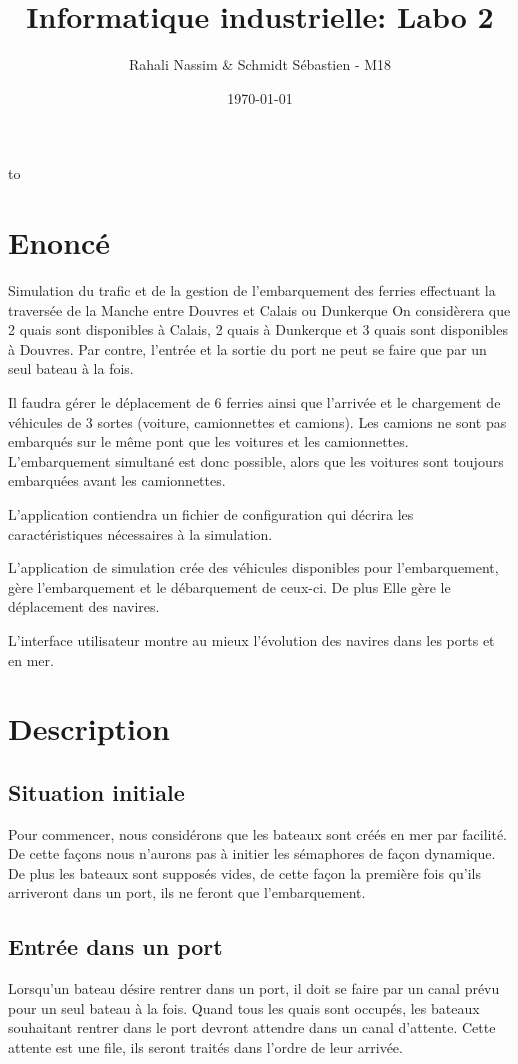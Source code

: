 \documentclass[a4paper, 11pt]{article}
\date{\today}
\author{}
\title{}
\title{Informatique industrielle: Labo 2}
\author{Rahali Nassim \& Schmidt Sébastien -  M18}
\makeatletter
\def\clap#1{\hbox to 0pt{\hss #1\hss}}%
\def\haut#1#2#3{%
\hbox to \hsize{%
\rlap{\vtop{\raggedright #1}}%
\hss
\clap{\vtop{\centering #2}}%
\hss
\llap{\vtop{\raggedleft #3}}}}%
\def\bas#1#2#3{%
\hbox to \hsize{%
\rlap{\vbox{\raggedright #1}}%
\hss
\clap{\vbox{\centering #2}}%
\hss
\llap{\vbox{\raggedleft #3}}}}%
\def\maketitle{%
\thispagestyle{empty}\vbox to \vsize{%
\haut{}{\@blurb}{}
\vfill
\vspace{1cm}
\begin{flushleft}
\usefont{OT1}{ptm}{m}{n}
\huge \@title
\end{flushleft}
\par
\hrule height 4pt
\par
\begin{flushright}
\usefont{OT1}{phv}{m}{n}
\Large \@author
\par
\end{flushright}
\vspace{1cm}
\vfill
\vfill
\bas{}{\@location, le \@date}{}
}%
\cleardoublepage
}
\makeatother
\begin{document}
\maketitle

\tableofcontents
\newpage

\section{Enoncé}
	Simulation du trafic et de la gestion de l'embarquement des ferries effectuant la traversée de la Manche entre Douvres et Calais ou Dunkerque
On considèrera que 2 quais sont disponibles à Calais, 2 quais à Dunkerque et 3 quais sont disponibles à Douvres. Par contre, l'entrée et la sortie du port ne peut se faire que par un seul bateau à la fois.

Il faudra gérer le déplacement de 6 ferries ainsi que l'arrivée et le chargement de véhicules de 3 sortes (voiture, camionnettes et camions). Les camions ne sont pas embarqués sur le même pont que les voitures et les camionnettes. L'embarquement simultané est donc possible, alors que les voitures sont toujours embarquées avant les camionnettes.

L'application contiendra un fichier de configuration qui décrira les caractéristiques nécessaires à la simulation.

L'application de simulation crée des véhicules disponibles pour l'embarquement, gère l'embarquement et le débarquement de ceux-ci. De plus Elle gère le déplacement des navires.

L'interface utilisateur montre au mieux l'évolution des navires dans les ports et en mer.

\section{Description}
	\subsection{Situation initiale}\label{init}
		Pour commencer, nous considérons que les bateaux sont créés en mer par facilité. De cette façons nous n'aurons pas à initier les sémaphores de façon dynamique. De plus les bateaux sont supposés vides, de cette façon la première fois qu'ils arriveront dans un port, ils ne feront que l'embarquement.
	\subsection{Entrée dans un port}
		Lorsqu'un bateau désire rentrer dans un port, il doit se faire par un canal prévu pour un seul bateau à la fois. Quand tous les quais sont occupés, les bateaux souhaitant rentrer dans le port devront attendre dans un canal d'attente. Cette attente est une file, ils seront traités dans l'ordre de leur arrivée.
\end{document}
